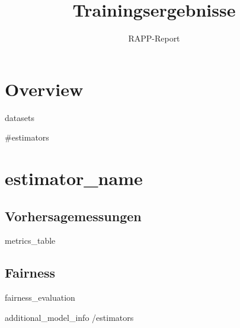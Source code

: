 \documentclass{hhuarticle}
\author{RAPP-Report}
\title{Trainingsergebnisse}
\begin{document}
\maketitle

\tableofcontents

\section{Overview}

{{{datasets}}}

{{#estimators}}
\clearpage
\section{ {{estimator_name}} }

\subsection{Vorhersagemessungen}
{{{metrics_table}}}

\subsection{Fairness}
{{{fairness_evaluation}}}

{{{additional_model_info}}}
{{/estimators}}
\end{document}
